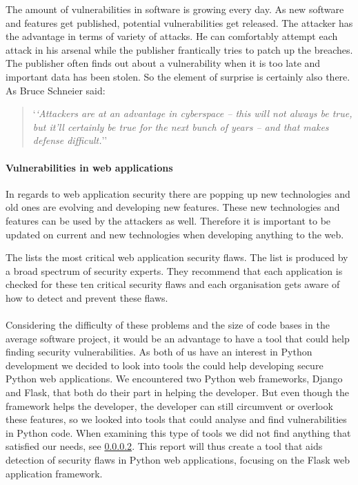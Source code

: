 The amount of vulnerabilities in software is growing every day.
As new software and features get published, potential vulnerabilities get released.
The attacker has the advantage in terms of variety of attacks.
He can comfortably attempt each attack in his arsenal while the publisher frantically tries to patch up the breaches.
The publisher often finds out about a vulnerability when it is too late and important data has been stolen.
So the element of surprise is certainly also there.
As Bruce Schneier said:
\begin{quote}
`\textit{`Attackers are at an advantage in cyberspace – this will not always be true, but it’ll certainly be true for the next bunch of years – and that makes defense difficult.}''\cite{schneier_interview}  
\end{quote}

\paragraph{Vulnerabilities in web applications}
In regards to web application security there are popping up new technologies and old ones are evolving and developing new features.
These new technologies and features can be used by the attackers as well.
Therefore it is important to be updated on current and new technologies when developing anything to the web.\cite{web_security_importance}

The \citet{OWASP10} lists the most critical web application security flaws.
The list is produced by a broad spectrum of security experts. 
They recommend that each application is checked for these ten critical security flaws and each organisation gets aware of how to detect and prevent these flaws.

\paragraph{}
Considering the difficulty of these problems and the size of code bases in the average software project, it would be an advantage to have a tool that could help finding security vulnerabilities.
As both of us have an interest in Python development we decided to look into tools the could help developing secure Python web applications.
We encountered two Python web frameworks, Django and Flask, that both do their part in helping the developer.
But even though the framework helps the developer, the developer can still circumvent or overlook these features, so we looked into tools that could analyse and find vulnerabilities in Python code.
When examining this type of tools we did not find anything that satisfied our needs, see \cref{}.
This report will thus create a tool that aids detection of security flaws in Python web applications, focusing on the Flask web application framework.
